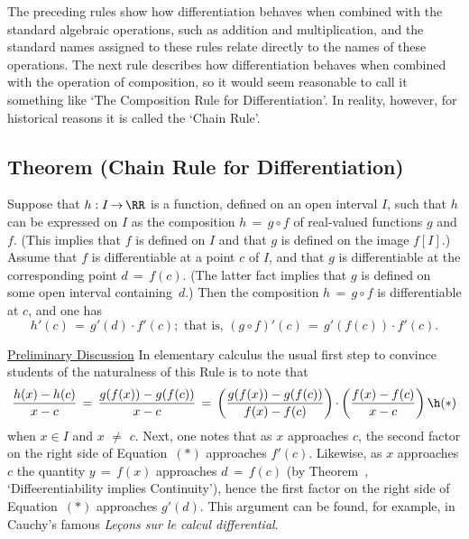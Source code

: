         The preceding rules show how differentiation behaves when combined with the standard algebraic operations,
    such as addition and multiplication, and the standard names assigned to these rules relate directly to the names of these operations.
    The next rule describes how differentiation behaves when combined with the operation of composition,
    so it would seem reasonable to call it something like `The Composition Rule for Differentiation'.
    In reality, however, for historical reasons it is called the `Chain Rule'.

\V

            \subsection{\small{\bf Theorem} (Chain Rule for Differentiation)}
            \label{ThmE30.70}

\V

        Suppose that $h:I \,{\rightarrow}\, {\RR}$ is a function, defined on an open interval $I$, such that $h$ can be expressed on $I$ as the composition $h \,=\, g{\circ}f$
    of real-valued functions $g$ and $f$. (This implies that $f$ is defined on $I$ and that $g$ is defined on the image $f[I]$.)
    Assume that $f$ is differentiable at a point $c$ of $I$, and that $g$ is differentiable at the corresponding point $d \,=\, f(c)$.
    (The latter fact implies that $g$ is defined on some open interval containing~$d$.) Then the composition $h \,=\, g{\circ}f$ is differentiable at $c$, and one has
        \begin{displaymath}
        h'(c) \,=\, g'(d){\cdot}f'(c); \mbox{ that is, }
    (g{\circ}f)'(c) \,=\, g'(f(c)){\cdot}f'(c).
        \end{displaymath}

\V

        \underline{Preliminary Discussion} In elementary calculus the usual first step to convince students of the naturalness of this Rule is to note that
        \begin{displaymath}
        \frac{h(x)-h(c)}{x-c} \,=\, \frac{g(f(x))-g(f(c))}{x-c} \,=\, 
    \left(\frac{g(f(x))-g(f(c))}{f(x)-f(c)}\right) {\cdot}
    \left(\frac{f(x)-f(c)}{x-c}\right) \h ({\ast})
        \end{displaymath}
    when $x{\in}I$ and $x \,\,{\neq}\,\, c$. Next, one notes that as $x$ approaches $c$, the second factor on the right side of Equation~$({\ast})$ approaches $f'(c)$.
    Likewise, as $x$ approaches $c$ the quantity $y \,=\, f(x)$ approaches $d \,=\, f(c)$ (by Theorem~, `Diffeerentiability implies Continuity'),
    hence the first factor on the right side of Equation~$({\ast})$ approaches $g'(d)$. This argument can be found,
    for example, in Cauchy's famous {\em Le\c{c}ons sur le calcul differential}.

